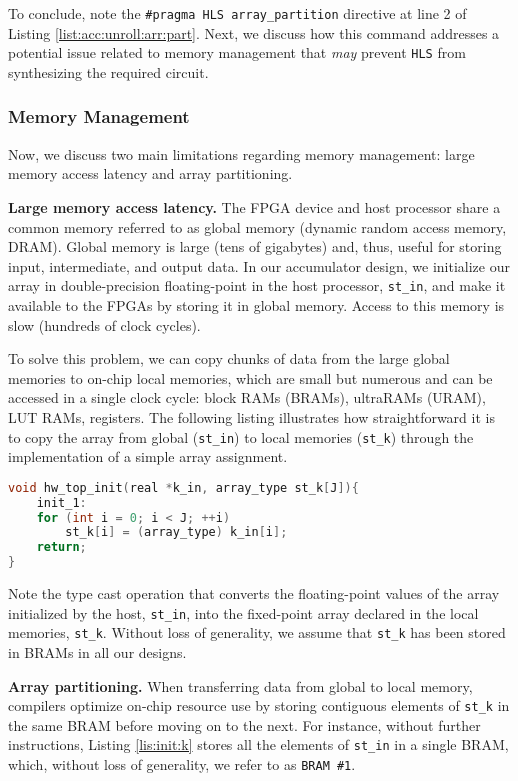 \documentclass[12pt,american]{article}
\begin{document}
To conclude, note the \texttt{\#pragma HLS array\_partition} directive at line 2 of Listing \ref{list:acc:unroll:arr:part}. Next, we discuss how this command addresses a potential issue related to memory management that \emph{may} prevent \texttt{HLS} from synthesizing the required circuit. 

\subsubsection{Memory Management}\label{sec:memman}

Now, we discuss two main limitations regarding memory management: large memory access latency and array partitioning.

\noindent\textbf{Large memory access latency.} The FPGA device and host processor share a common memory referred to as global memory (dynamic random access memory, DRAM). Global memory is large (tens of gigabytes) and, thus, useful for storing input, intermediate, and output data. In our accumulator design, we initialize our array in double-precision floating-point in the host processor, \texttt{st\_in}, and make it available to the FPGAs by storing it in global memory. Access to this memory is slow (hundreds of clock cycles). 

To solve this problem, we can copy chunks of data from the large global memories to on-chip local memories, which are small but numerous and can be accessed in a single clock cycle: block RAMs (BRAMs), ultraRAMs (URAM), LUT RAMs, registers. The following listing illustrates how straightforward it is to copy the array from global (\texttt{st\_in}) to local memories (\texttt{st\_k}) through the implementation of a simple array assignment.

\begin{lstlisting}[language=C,caption=Store Data from Global to Local Memories,basicstyle=\footnotesize, label=lis:init:k]
void hw_top_init(real *k_in, array_type st_k[J]){
    init_1:
    for (int i = 0; i < J; ++i)
        st_k[i] = (array_type) k_in[i];
    return;
}
\end{lstlisting}

Note the type cast operation that converts the floating-point values of the array initialized by the host, \texttt{st\_in}, into the fixed-point array declared in the local memories, \texttt{st\_k}. Without loss of generality, we assume that \texttt{st\_k} has been stored in BRAMs in all our designs.

\noindent\textbf{Array partitioning.} When transferring data from global to local memory, compilers optimize on-chip resource use by storing contiguous elements of \texttt{st\_k} in the same BRAM before moving on to the next. For instance, without further instructions, Listing \ref{lis:init:k} stores all the elements of \texttt{st\_in} in a single BRAM, which, without loss of generality, we refer to as \texttt{BRAM \#1}.
\end{document}
